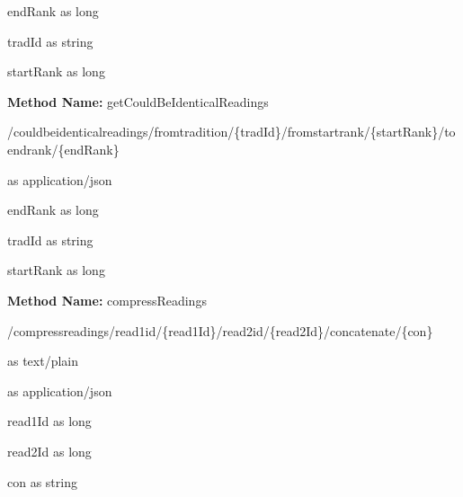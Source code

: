 \begin{parameter}
endRank as long
\end{parameter}
\begin{parameter}
tradId as string
\end{parameter}
\begin{parameter}
startRank as long
\end{parameter}
\textbf{Method Name: }getCouldBeIdenticalReadings
\begin{get}
/couldbeidenticalreadings/fromtradition/\{tradId\}/fromstartrank/\{startRank\}/toendrank/\{endRank\}
\end{get}
\begin{response}
 as application/json
\end{response}
\begin{parameter}
endRank as long
\end{parameter}
\begin{parameter}
tradId as string
\end{parameter}
\begin{parameter}
startRank as long
\end{parameter}
\textbf{Method Name: }compressReadings
\begin{post}
/compressreadings/read1id/\{read1Id\}/read2id/\{read2Id\}/concatenate/\{con\}
\end{post}
\begin{request}
 as text/plain
\end{request}
\begin{response}
 as application/json
\end{response}
\begin{parameter}
read1Id as long
\end{parameter}
\begin{parameter}
read2Id as long
\end{parameter}
\begin{parameter}
con as string
\end{parameter}
